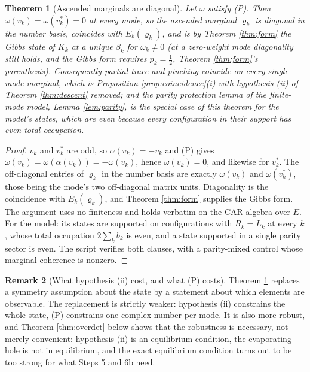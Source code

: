 \documentclass[11pt]{article}
\newtheorem{theorem}{Theorem}[section]
\theoremstyle{definition}
\newtheorem{remark}[theorem]{Remark}
\begin{document}
\begin{theorem}[Ascended marginals are diagonal]\label{thm:even}
Let $\omega$ satisfy (P). Then $\omega(v_k) = \omega(v_k^{*}) = 0$ at every mode, so the ascended marginal $\varrho_k$ is diagonal in the number basis, coincides with $E_k(\varrho_k)$, and is by Theorem \ref{thm:form} the Gibbs state of $K_k$ at a unique $\beta_k$ for $\omega_k \neq 0$ (at a zero-weight mode diagonality still holds, and the Gibbs form requires $p_k = \tfrac12$, Theorem \ref{thm:form}'s parenthesis). Consequently partial trace and pinching coincide on every single-mode marginal, which is Proposition \ref{prop:coincidence}(i) with hypothesis (ii) of Theorem \ref{thm:descent} removed; and the parity protection lemma of the finite-mode model, Lemma \ref{lem:parity}, is the special case of this theorem for the model's states, which are even because every configuration in their support has even total occupation.
\end{theorem}

\begin{proof}
$v_k$ and $v_k^{*}$ are odd, so $\alpha(v_k) = -v_k$ and (P) gives $\omega(v_k) = \omega(\alpha(v_k)) = -\omega(v_k)$, hence $\omega(v_k) = 0$, and likewise for $v_k^{*}$. The off-diagonal entries of $\varrho_k$ in the number basis are exactly $\omega(v_k)$ and $\omega(v_k^{*})$, those being the mode's two off-diagonal matrix units. Diagonality is the coincidence with $E_k(\varrho_k)$, and Theorem \ref{thm:form} supplies the Gibbs form. The argument uses no finiteness and holds verbatim on the CAR algebra over $E$. For the model: its states are supported on configurations with $R_k = L_k$ at every $k$, whose total occupation $2\sum_k b_k$ is even, and a state supported in a single parity sector is even. The script verifies both clauses, with a parity-mixed control whose marginal coherence is nonzero.
\end{proof}

\begin{remark}[What hypothesis (ii) cost, and what (P) costs]\label{rem:bought}
Theorem \ref{thm:even} replaces a symmetry assumption about the state by a statement about which elements are observable. The replacement is strictly weaker: hypothesis (ii) constrains the whole state, (P) constrains one complex number per mode. It is also more robust, and Theorem \ref{thm:overdet} below shows that the robustness is necessary, not merely convenient: hypothesis (ii) is an equilibrium condition, the evaporating hole is not in equilibrium, and the exact equilibrium condition turns out to be too strong for what Steps 5 and 6b need.
\end{remark}
\end{document}
